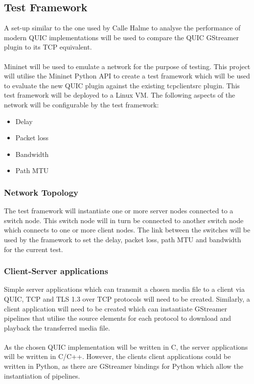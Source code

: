\documentclass[11pt]{article}
\begin{document}
\subsection{Test Framework}

A set-up similar to the one used by Calle Halme to analyse the performance of modern QUIC implementations\cite{Calle} will be used to compare the QUIC GStreamer plugin to its TCP equivalent.
\\\\
Mininet will be used to emulate a network for the purpose of testing. This project will utilise the Mininet Python API to create a test framework which will be used to evaluate the new QUIC plugin against the existing tcpclientsrc plugin. This test framework will be deployed to a Linux VM. The following aspects of the network will be configurable by the test framework:

\begin{itemize}
    \item Delay
    \item Packet loss
    \item Bandwidth
    \item Path MTU
\end{itemize}

\bigskip
{}

\subsubsection{Network Topology}
The test framework will instantiate one or more server nodes connected to a switch node. This switch node will in turn be connected to another switch node which connects to one or more client nodes. The link between the switches will be used by the framework to set the delay, packet loss, path MTU and bandwidth for the current test.

\subsubsection{Client-Server applications}

Simple server applications which can transmit a chosen media file to a client via QUIC, TCP and TLS 1.3 over TCP protocols will need to be created. Similarly, a client application will need to be created which can instantiate GStreamer pipelines that utilise the source elements for each protocol to download and playback the transferred media file. \\\\As the chosen QUIC implementation will be written in C, the server applications will be written in C/C++. However, the clients client applications could be written in Python, as there are GStreamer bindings for Python which allow the instantiation of pipelines.
\end{document}
